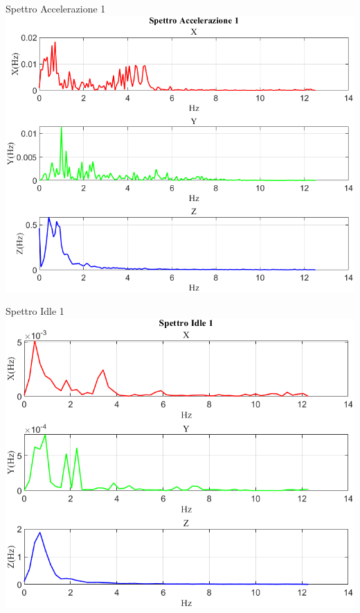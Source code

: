 \documentclass[beamer]{standalone}
\begin{document}
	\begin{frame}{{Spettro Accelerazione 1}}
		\centering\includegraphics[height=.8\textheight]{figure/Vel/Trasformata/Spettro Accelerazione 1}
	\end{frame}
	
	\begin{frame}{{Spettro Idle 1}}
		\centering\includegraphics[height=.8\textheight]{figure/Vel/Trasformata/Spettro Idle 1}
	\end{frame}
	
\end{document}
